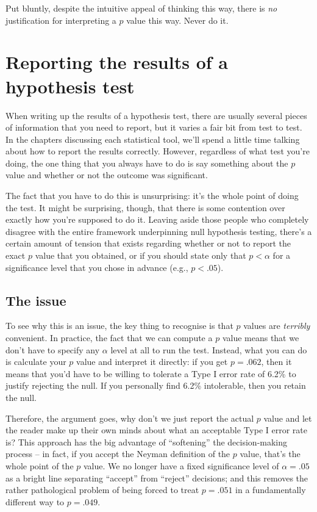 \documentclass[
]{book}
\theoremstyle{definition}
\theoremstyle{definition}
\theoremstyle{definition}
\theoremstyle{definition}
\theoremstyle{remark}
\begin{document}
Put bluntly, despite the intuitive appeal of thinking this way, there is \emph{no} justification for interpreting a \(p\) value this way. Never do it.

\hypertarget{writeup}{%
\section{Reporting the results of a hypothesis test}\label{writeup}}

When writing up the results of a hypothesis test, there are usually several pieces of information that you need to report, but it varies a fair bit from test to test. In the chapters discussing each statistical tool, we'll spend a little time talking about how to report the results correctly. However, regardless of what test you're doing, the one thing that you always have to do is say something about the \(p\) value and whether or not the outcome was significant.

The fact that you have to do this is unsurprising: it's the whole point of doing the test. It might be surprising, though, that there is some contention over exactly how you're supposed to do it. Leaving aside those people who completely disagree with the entire framework underpinning null hypothesis testing, there's a certain amount of tension that exists regarding whether or not to report the exact \(p\) value that you obtained, or if you should state only that \(p < \alpha\) for a significance level that you chose in advance (e.g., \(p<.05\)).

\hypertarget{the-issue}{%
\subsection{The issue}\label{the-issue}}

To see why this is an issue, the key thing to recognise is that \(p\) values are \emph{terribly} convenient. In practice, the fact that we can compute a \(p\) value means that we don't have to specify any \(\alpha\) level at all to run the test. Instead, what you can do is calculate your \(p\) value and interpret it directly: if you get \(p = .062\), then it means that you'd have to be willing to tolerate a Type I error rate of 6.2\% to justify rejecting the null. If you personally find 6.2\% intolerable, then you retain the null.

Therefore, the argument goes, why don't we just report the actual \(p\) value and let the reader make up their own minds about what an acceptable Type I error rate is? This approach has the big advantage of ``softening'' the decision-making process -- in fact, if you accept the Neyman definition of the \(p\) value, that's the whole point of the \(p\) value. We no longer have a fixed significance level of \(\alpha = .05\) as a bright line separating ``accept'' from ``reject'' decisions; and this removes the rather pathological problem of being forced to treat \(p = .051\) in a fundamentally different way to \(p = .049\).
\end{document}
